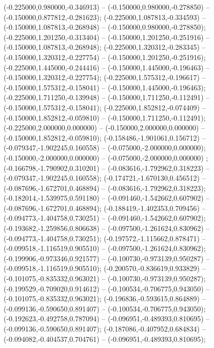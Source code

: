  (-0.225000,0.980000,-0.346913) -- (-0.150000,0.980000,-0.278850) -- (-0.150000,0.877812,-0.281623);
 (-0.225000,1.087813,-0.334593) -- (-0.150000,1.087813,-0.268948) -- (-0.150000,0.980000,-0.278850);
 (-0.225000,1.201250,-0.313404) -- (-0.150000,1.201250,-0.251916) -- (-0.150000,1.087813,-0.268948);
 (-0.225000,1.320312,-0.283345) -- (-0.150000,1.320312,-0.227754) -- (-0.150000,1.201250,-0.251916);
 (-0.225000,1.445000,-0.244416) -- (-0.150000,1.445000,-0.196463) -- (-0.150000,1.320312,-0.227754);
 (-0.225000,1.575312,-0.196617) -- (-0.150000,1.575312,-0.158041) -- (-0.150000,1.445000,-0.196463);
 (-0.225000,1.711250,-0.139948) -- (-0.150000,1.711250,-0.112491) -- (-0.150000,1.575312,-0.158041);
 (-0.225000,1.852812,-0.074409) -- (-0.150000,1.852812,-0.059810) -- (-0.150000,1.711250,-0.112491);
 (-0.225000,2.000000,0.000000) -- (-0.150000,2.000000,0.000000) -- (-0.150000,1.852812,-0.059810);
 (-0.158486,-1.901061,0.156712) -- (-0.079347,-1.902245,0.160558) -- (-0.075000,-2.000000,0.000000);
 (-0.150000,-2.000000,0.000000) -- (-0.075000,-2.000000,0.000000) ;
 (-0.166798,-1.790902,0.310201) -- (-0.083616,-1.792962,0.318223) -- (-0.079347,-1.902245,0.160558);
 (-0.174721,-1.670130,0.456512) -- (-0.087696,-1.672701,0.468894) -- (-0.083616,-1.792962,0.318223);
 (-0.182014,-1.539975,0.591180) -- (-0.091460,-1.542662,0.607902) -- (-0.087696,-1.672701,0.468894);
 (-0.188419,-1.402353,0.709456) -- (-0.094773,-1.404758,0.730251) -- (-0.091460,-1.542662,0.607902);
 (-0.193682,-1.259856,0.806638) -- (-0.097500,-1.261624,0.830962) -- (-0.094773,-1.404758,0.730251);
 (-0.197572,-1.115662,0.878471) -- (-0.099518,-1.116519,0.905510) -- (-0.097500,-1.261624,0.830962);
 (-0.199906,-0.973346,0.921577) -- (-0.100730,-0.973139,0.950287) -- (-0.099518,-1.116519,0.905510);
 (-0.200570,-0.836619,0.933829) -- (-0.101075,-0.835332,0.963021) -- (-0.100730,-0.973139,0.950287);
 (-0.199529,-0.709020,0.914612) -- (-0.100534,-0.706775,0.943050) -- (-0.101075,-0.835332,0.963021);
 (-0.196836,-0.593615,0.864889) -- (-0.099136,-0.590650,0.891407) -- (-0.100534,-0.706775,0.943050);
 (-0.192623,-0.492758,0.787094) -- (-0.096951,-0.489393,0.810695) -- (-0.099136,-0.590650,0.891407);
 (-0.187086,-0.407952,0.684834) -- (-0.094082,-0.404537,0.704761) -- (-0.096951,-0.489393,0.810695);

